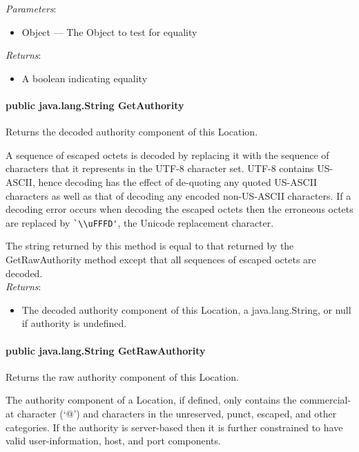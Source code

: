 \documentclass[$Date: 2003/06/26 19:29:31 $]{glabarticle}
\begin{document}
 \textit{Parameters}:
\begin{itemize}
\item[] Object --- The Object to test for equality 
\end{itemize}

\textit{Returns}:
\begin{itemize}
\item[] A boolean indicating equality
\end{itemize}

\paragraph{public java.lang.String GetAuthority}

Returns the decoded authority component of this Location.

A sequence of escaped octets is decoded by replacing it with the
sequence of characters that it represents in the UTF-8 character set.
UTF-8 contains US-ASCII, hence decoding has the effect of de-quoting
any quoted US-ASCII characters as well as that of decoding any encoded
non-US-ASCII characters.  If a decoding error occurs when decoding the
escaped octets then the erroneous octets are replaced by
\verb"`\\uFFFD'", the Unicode replacement character.

The string returned by this method is equal to that returned by the
GetRawAuthority method except that all sequences of escaped octets are
decoded. \\
 
\textit{Returns}:
\begin{itemize}
\item[] The decoded authority component of this Location, a java.lang.String, or null if authority is undefined.
\end{itemize}

\paragraph{public java.lang.String GetRawAuthority}

Returns the raw authority component of this Location.

The authority component of a Location, if defined, only contains the
commercial-at character (`@') and characters in the unreserved, punct,
escaped, and other categories.  If the authority is server-based then
it is further constrained to have valid user-information, host, and
port components.\\
 
\end{document}
